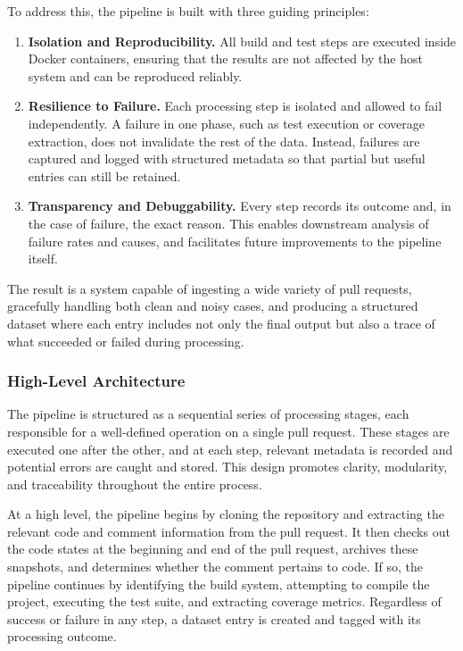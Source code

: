 To address this, the pipeline is built with three guiding principles:
\begin{enumerate}
	\item \textbf{Isolation and Reproducibility.} All build and test steps are executed inside
	      Docker containers, ensuring that the results are not affected by the host system and can
	      be reproduced reliably.

	\item \textbf{Resilience to Failure.} Each processing step is isolated and allowed to fail
	      independently. A failure in one phase, such as test execution or coverage extraction, does
	      not invalidate the rest of the data. Instead, failures are captured and logged with
	      structured metadata so that partial but useful entries can still be retained.

	\item \textbf{Transparency and Debuggability.} Every step records its outcome and, in the case
	      of failure, the exact reason. This enables downstream analysis of failure rates and causes,
	      and facilitates future improvements to the pipeline itself.
\end{enumerate}

The result is a system capable of ingesting a wide variety of pull requests, gracefully handling
both clean and noisy cases, and producing a structured dataset where each entry includes not only
the final output but also a trace of what succeeded or failed during processing.

\subsubsection{High-Level Architecture}

The pipeline is structured as a sequential series of processing stages, each responsible for a
well-defined operation on a single pull request. These stages are executed one after the other, and
at each step, relevant metadata is recorded and potential errors are caught and stored. This design
promotes clarity, modularity, and traceability throughout the entire process.

At a high level, the pipeline begins by cloning the repository and extracting the relevant code and
comment information from the pull request. It then checks out the code states at the beginning and
end of the pull request, archives these snapshots, and determines whether the comment pertains to
code. If so, the pipeline continues by identifying the build system, attempting to compile the
project, executing the test suite, and extracting coverage metrics. Regardless of success or failure
in any step, a dataset entry is created and tagged with its processing outcome.

